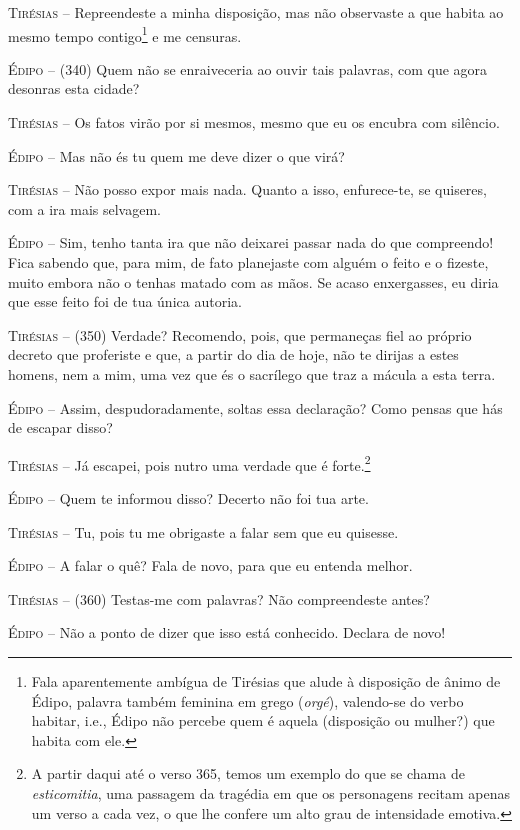 \textsc{Tirésias} --   Repreendeste a minha disposição, mas não observaste a que habita ao
mesmo tempo contigo\footnote{Fala aparentemente ambígua de Tirésias que
  alude à disposição de ânimo de Édipo, palavra também feminina em grego
  (\emph{orgé}), valendo-se do verbo habitar, i.e., Édipo não percebe
  quem é aquela (disposição ou mulher?) que habita com ele.} e me
censuras.

\textsc{Édipo} --   (340) Quem não se enraiveceria ao ouvir tais palavras, com que agora
desonras esta cidade?

\textsc{Tirésias} --   Os fatos virão por si mesmos, mesmo que eu os encubra com silêncio.

\textsc{Édipo} --   Mas não és tu quem me deve dizer o que virá?

\textsc{Tirésias} --   Não posso expor mais nada. Quanto a isso, enfurece-te, se quiseres, com
a ira mais selvagem.

\textsc{Édipo} --   Sim, tenho tanta ira que não deixarei passar nada do que compreendo!
Fica sabendo que, para mim, de fato planejaste com alguém o feito e o
fizeste, muito embora não o tenhas matado com as mãos. Se acaso
enxergasses, eu diria que esse feito foi de tua única autoria.

\textsc{Tirésias} --   (350) Verdade? Recomendo, pois, que permaneças fiel ao próprio decreto
que proferiste e que, a partir do dia de hoje, não te dirijas a estes
homens, nem a mim, uma vez que és o sacrílego que traz a mácula a esta
terra.

\textsc{Édipo} --   Assim, despudoradamente, soltas essa declaração? Como pensas que hás de
escapar disso?

\textsc{Tirésias} --   Já escapei, pois nutro uma verdade que é forte.\footnote{A partir daqui até o verso 365, temos um
  exemplo do que se chama de \emph{esticomitia}, uma passagem da
  tragédia em que os personagens recitam apenas um verso a cada vez, o
  que lhe confere um alto grau de intensidade emotiva.}

\textsc{Édipo} --   Quem te informou disso? Decerto não foi tua arte.

\textsc{Tirésias} --   Tu, pois tu me obrigaste a falar sem que eu quisesse.

\textsc{Édipo} --   A falar o quê? Fala de novo, para que eu entenda melhor.

\textsc{Tirésias} --   (360) Testas-me com palavras? Não compreendeste antes?

\textsc{Édipo} --   Não a ponto de dizer que isso está conhecido. Declara de novo!

